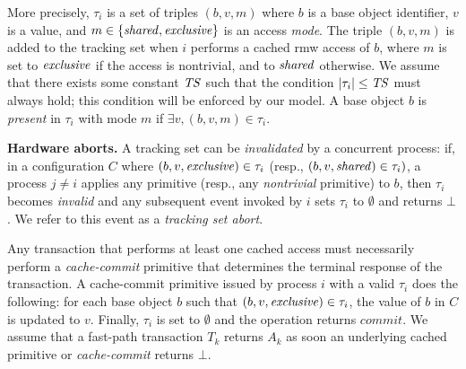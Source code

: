 More precisely, $\tau_i$ is a set of triples $(b, v, m)$ where $b$ is a base object identifier, $v$ is a value, 
and $m \in \{\mathit{shared}, \mathit{exclusive}\}$ is an access \emph{mode}. 
The triple $(b, v, m)$ is added to the tracking set when $i$ performs a cached
rmw access of $b$, where $m$ is set to $\mathit{exclusive}$ if the access is
nontrivial, and to $\mathit{shared}$ otherwise.  
We assume that there exists some constant $\mathit{TS}$
such that the condition $|\tau_i| \leq \mathit{TS}$ must always hold; this
condition will be enforced by our model.
A base object $b$ is \emph{present} in $\tau_i$ with mode $m$ if $\exists v, (b,v,m) \in \tau_i$.

%
\vspace{1mm}\noindent\textbf{Hardware aborts.}
A tracking set can be \emph{invalidated} by a concurrent process: 
if, in a configuration $C$ where  $(b,v,\mathit{exclusive})\in\tau_i$
(resp., $(b,v,\mathit{shared})\in\tau_i)$,  a process $j\neq i$ applies any primitive 
(resp., any \emph{nontrivial} primitive) to $b$, then $\tau_i$ becomes
\emph{invalid} and any subsequent event invoked by $i$
sets $\tau_i$ to $\emptyset$ and returns $\bot$. We refer to this event as a \emph{tracking set abort}.

Any transaction that performs at least one cached access must necessarily perform a \emph{cache-commit} primitive 
that determines the terminal response of the transaction.
A cache-commit primitive
issued by process $i$ with
a valid $\tau_i$ does the following: for each base object $b$ such that $(b,v,\mathit{exclusive}) \in \tau_i$, the value of $b$ in $C$ is updated to $v$. 
Finally, $\tau_i$ is set to $\emptyset$ and the operation returns $\textit{commit}$. 
We assume that a fast-path transaction $T_k$ returns $A_k$
as soon an underlying cached primitive or \emph{cache-commit} returns $\bot$.

